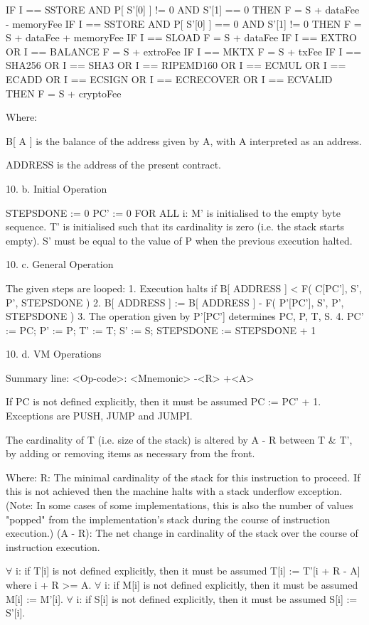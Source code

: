 \documentclass[9pt,oneside]{amsart}
\begin{document}
\begin{multicols}{2}
IF I == SSTORE AND P[ S'[0] ] != 0 AND S'[1] == 0 THEN
    F = S + dataFee - memoryFee
IF I == SSTORE AND P[ S'[0] ] == 0 AND S'[1] != 0 THEN
    F = S + dataFee + memoryFee
IF I == SLOAD
    F = S + dataFee
IF I == EXTRO OR I == BALANCE
    F = S + extroFee
IF I == MKTX
    F = S + txFee
IF I == SHA256 OR I == SHA3 OR I == RIPEMD160 OR I == ECMUL OR I == ECADD
    OR I == ECSIGN OR I == ECRECOVER OR I == ECVALID THEN
    F = S + cryptoFee 

Where:

B[ A ] is the balance of the address given by A, with A interpreted as an address.

ADDRESS is the address of the present contract.


10. b. Initial Operation

STEPSDONE := 0
PC' := 0
FOR ALL i: M' is initialised to the empty byte sequence.
T' is initialised such that its cardinality is zero (i.e. the stack starts empty).
S' must be equal to the value of P when the previous execution halted.


10. c. General Operation

The given steps are looped:
1. Execution halts if B[ ADDRESS ] < F( C[PC'], S', P', STEPSDONE )
2. B[ ADDRESS ] := B[ ADDRESS ] - F( P'[PC'], S', P', STEPSDONE )
3. The operation given by P'[PC'] determines PC, P, T, S.
4. PC' := PC; P' := P; T' := T; S' := S; STEPSDONE := STEPSDONE + 1


10. d. VM Operations

Summary line:
<Op-code>: <Mnemonic> -<R> +<A>

If PC is not defined explicitly, then it must be assumed PC := PC' + 1. Exceptions are PUSH, JUMP and JUMPI.

The cardinality of T (i.e. size of the stack) is altered by A - R between T \& T', by adding or removing items as necessary from the front.

Where:
R: The minimal cardinality of the stack for this instruction to proceed. If this is not achieved then the machine halts with a stack underflow exception. (Note: In some cases of some implementations, this is also the number of values "popped" from the implementation's stack during the course of instruction execution.)
(A - R): The net change in cardinality of the stack over the course of instruction execution.

$\forall$ i: if T[i] is not defined explicitly, then it must be assumed T[i] := T'[i + R - A] where i + R >= A.
$\forall$ i: if M[i] is not defined explicitly, then it must be assumed M[i] := M'[i].
$\forall$ i: if S[i] is not defined explicitly, then it must be assumed S[i] := S'[i].


\end{multicols}
\end{document}
